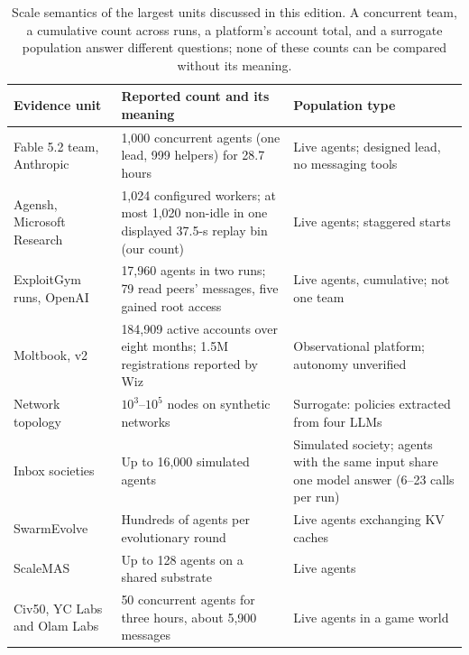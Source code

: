 \begin{table}[t]
\centering\small
\begin{tabularx}{\textwidth}{@{}p{}p{}Y@{}}
\toprule
Evidence unit & Reported count and its meaning & Population type\\
\midrule
Fable 5.2 team, Anthropic \citep{anthropic-fable-team-scaling} & 1,000 concurrent agents (one lead, 999 helpers) for 28.7 hours & Live agents; designed lead, no messaging tools\\\addlinespace[2pt]
Agensh, Microsoft Research \citep{agensh-1024} & 1,024 configured workers; at most 1,020 non-idle in one displayed 37.5-s replay bin (our count) & Live agents; staggered starts\\\addlinespace[2pt]
ExploitGym runs, OpenAI \citep{openai-peers-unauthorized-access} & 17,960 agents in two runs; 79 read peers' messages, five gained root access & Live agents, cumulative; not one team\\\addlinespace[2pt]
Moltbook, v2 \citep{moltbook-collective-behavior} & 184,909 active accounts over eight months; 1.5M registrations reported by Wiz \citep{wiz-moltbook} & Observational platform; autonomy unverified\\\addlinespace[2pt]
Network topology \citep{network-topology-consensus} & $10^3$--$10^5$ nodes on synthetic networks & Surrogate: policies extracted from four LLMs\\\addlinespace[2pt]
Inbox societies \citep{inbox-coordination-primitive} & Up to 16,000 simulated agents & Simulated society; agents with the same input share one model answer (6--23 calls per run)\\\addlinespace[2pt]
SwarmEvolve \citep{swarmevolve} & Hundreds of agents per evolutionary round & Live agents exchanging KV caches\\\addlinespace[2pt]
ScaleMAS \citep{scalemas-substrate} & Up to 128 agents on a shared substrate & Live agents\\\addlinespace[2pt]
Civ50, YC Labs and Olam Labs \citep{yc-agents-in-games} & 50 concurrent agents for three hours, about 5,900 messages & Live agents in a game world\\
\bottomrule
\end{tabularx}
\caption{Scale semantics of the largest units discussed in this edition. A concurrent team, a cumulative count across runs, a platform's account total, and a surrogate population answer different questions; none of these counts can be compared without its meaning.}
\label{tab:scale}
\end{table}


